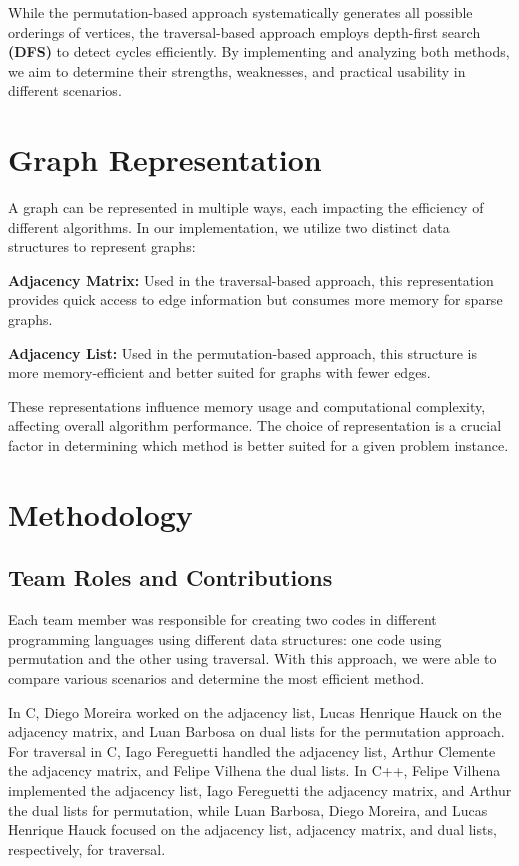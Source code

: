 \documentclass{sbc2023}%
\begin{document}
While the permutation-based approach systematically generates all possible orderings of vertices, the traversal-based approach employs depth-first search \textbf{(DFS)} to detect cycles efficiently. By implementing and analyzing both methods, we aim to determine their strengths, weaknesses, and practical usability in different scenarios.
 
\section{Graph Representation}
A graph can be represented in multiple ways, each impacting the efficiency of different algorithms. In our implementation, we utilize two distinct data structures to represent graphs:

\textbf{Adjacency Matrix:} Used in the traversal-based approach, this representation provides quick access to edge information but consumes more memory for sparse graphs.

\textbf{Adjacency List:} Used in the permutation-based approach, this structure is more memory-efficient and better suited for graphs with fewer edges.

These representations influence memory usage and computational complexity, affecting overall algorithm performance. The choice of representation is a crucial factor in determining which method is better suited for a given problem instance.

\section{Methodology}
\subsection{Team Roles and Contributions}
Each team member was responsible for creating two codes in different programming languages using different data structures: one code using permutation and the other using traversal. With this approach, we were able to compare various scenarios and determine the most efficient method.

In C, Diego Moreira worked on the adjacency list, Lucas Henrique Hauck on the adjacency matrix, and Luan Barbosa on dual lists for the permutation approach. For traversal in C, Iago Fereguetti handled the adjacency list, Arthur Clemente the adjacency matrix, and Felipe Vilhena the dual lists. In C++, Felipe Vilhena implemented the adjacency list, Iago Fereguetti the adjacency matrix, and Arthur the dual lists for permutation, while Luan Barbosa, Diego Moreira, and Lucas Henrique Hauck focused on the adjacency list, adjacency matrix, and dual lists, respectively, for traversal.
\end{document}
